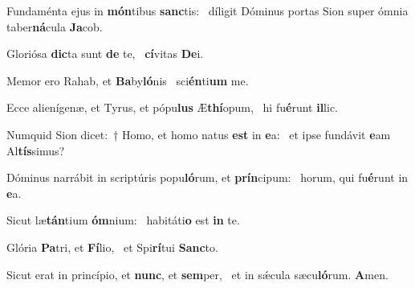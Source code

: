 \item Fundaménta ejus in \textbf{món}tibus \textbf{sanc}tis:~\psstar{} díligit Dóminus portas Sion super ómnia taber\textbf{ná}cula \textbf{Ja}cob.
\item Gloriósa \textbf{dic}ta sunt \textbf{de} te,~\psstar{} \textbf{cí}vitas \textbf{De}i.
\item Memor ero Rahab, et \textbf{Ba}by\textbf{ló}nis~\psstar{} sci\textbf{én}ti\textbf{um} me.
\item Ecce alienígenæ, et Tyrus, et pópu\textbf{lus} Æ\textbf{thí}opum,~\psstar{} hi fu\textbf{é}runt \textbf{il}lic.
\item Numquid Sion dicet:~† Homo, et homo natus \textbf{est} in \textbf{e}a:~\psstar{} et ipse fundávit \textbf{e}am Al\textbf{tís}simus?
\item Dóminus narrábit in scriptúris popu\textbf{ló}rum, et \textbf{prín}cipum:~\psstar{} horum, qui fu\textbf{é}runt in \textbf{e}a.
\item Sicut læ\textbf{tán}tium \textbf{óm}nium:~\psstar{} habitáti\textbf{o} est \textbf{in} te.
\item Glória \textbf{Pa}tri, et \textbf{Fí}lio,~\psstar{} et Spi\textbf{rí}tui \textbf{Sanc}to.
\item Sicut erat in princípio, et \textbf{nunc}, et \textbf{sem}per,~\psstar{} et in sǽcula sæcu\textbf{ló}rum. \textbf{A}men.

